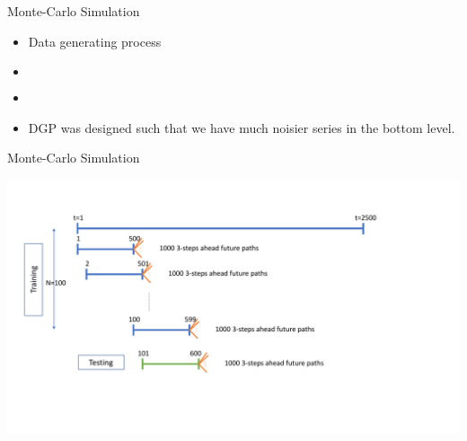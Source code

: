 \documentclass[11pt,xcolor=dvipsnames,table]{beamer} %
\begin{document}
\begin{frame}{Monte-Carlo Simulation}
\begin{itemize}
	\item Data generating process
	\item[] 
	\begin{columns}
		\centering
		\begin{figure}
			\begin{center}
				  
				\qobitree
			\end{center}
		\end{figure}
		
		\begin{figure}
			\begin{center}
				  
				 
				\qobitree
			\end{center}
		\end{figure}
	\end{columns} 
	\item[]
	\item DGP was designed such that we have much noisier series in the bottom level.
	
\end{itemize}
\end{frame}


\begin{frame}{Monte-Carlo Simulation}

\includegraphics[scale=0.4]{Figs/Optimisation_TestingG.pdf}

\end{frame}

\end{document}
